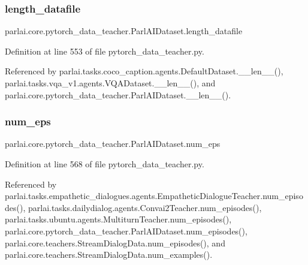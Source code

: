 \subsubsection{\texorpdfstring{length\+\_\+datafile}{length\_datafile}}
{\footnotesize\ttfamily parlai.\+core.\+pytorch\+\_\+data\+\_\+teacher.\+Parl\+A\+I\+Dataset.\+length\+\_\+datafile}



Definition at line 553 of file pytorch\+\_\+data\+\_\+teacher.\+py.



Referenced by parlai.\+tasks.\+coco\+\_\+caption.\+agents.\+Default\+Dataset.\+\_\+\+\_\+len\+\_\+\+\_\+(), parlai.\+tasks.\+vqa\+\_\+v1.\+agents.\+V\+Q\+A\+Dataset.\+\_\+\+\_\+len\+\_\+\+\_\+(), and parlai.\+core.\+pytorch\+\_\+data\+\_\+teacher.\+Parl\+A\+I\+Dataset.\+\_\+\+\_\+len\+\_\+\+\_\+().

\mbox{\label{classparlai_1_1core_1_1pytorch__data__teacher_1_1ParlAIDataset_a4cdb36350cb9d6ea76b2c8eeb4bb1aaf}} 
\subsubsection{\texorpdfstring{num\+\_\+eps}{num\_eps}}
{\footnotesize\ttfamily parlai.\+core.\+pytorch\+\_\+data\+\_\+teacher.\+Parl\+A\+I\+Dataset.\+num\+\_\+eps}



Definition at line 568 of file pytorch\+\_\+data\+\_\+teacher.\+py.



Referenced by parlai.\+tasks.\+empathetic\+\_\+dialogues.\+agents.\+Empathetic\+Dialogue\+Teacher.\+num\+\_\+episodes(), parlai.\+tasks.\+dailydialog.\+agents.\+Convai2\+Teacher.\+num\+\_\+episodes(), parlai.\+tasks.\+ubuntu.\+agents.\+Multiturn\+Teacher.\+num\+\_\+episodes(), parlai.\+core.\+pytorch\+\_\+data\+\_\+teacher.\+Parl\+A\+I\+Dataset.\+num\+\_\+episodes(), parlai.\+core.\+teachers.\+Stream\+Dialog\+Data.\+num\+\_\+episodes(), and parlai.\+core.\+teachers.\+Stream\+Dialog\+Data.\+num\+\_\+examples().

